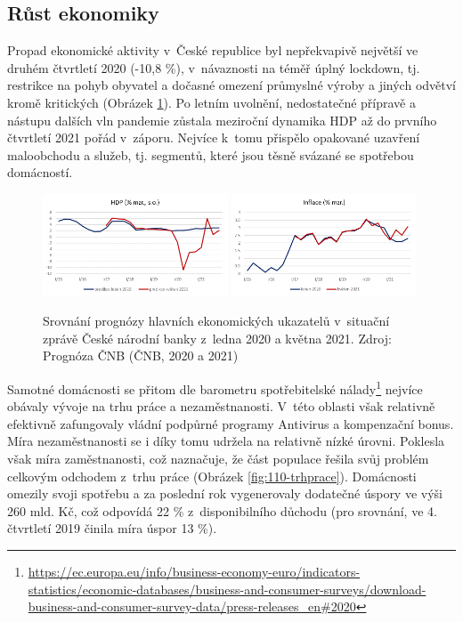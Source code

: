 \subsection*{R\r{u}st ekonomiky} 
Propad ekonomické aktivity v~České republice byl nepřekvapivě největší ve druhém čtvrtletí 2020 (-10,8 \%), v~návaznosti na téměř úplný lockdown, tj. restrikce na pohyb obyvatel a dočasné omezení průmyslné výroby a jiných odvětví kromě kritických (Obrázek \ref{fig:110-HDP}). Po letním uvolnění, nedostatečné přípravě a nástupu dalších vln pandemie zůstala meziroční dynamika HDP až do prvního čtvrtletí 2021 pořád v~záporu. Nejvíce k~tomu přispělo opakované uzavření maloobchodu a služeb, tj. segmentů, které jsou těsně svázané se spotřebou domácností. 

\begin{figure}[ht]
    \centering
    \includegraphics[width=0.49\textwidth]{./pic/HDP.png} \includegraphics[width=0.49\textwidth]{./pic/inflace.png}
    \caption{Srovnání prognózy hlavních ekonomických ukazatelů v~situační zprávě České národní banky z~ledna 2020 a května 2021. Zdroj: Prognóza ČNB (ČNB, 2020 a 2021)}
    \label{fig:110-HDP}
\end{figure} 

Samotné domácnosti se přitom dle barometru spotřebitelské nálady\footnote{\url{https://ec.europa.eu/info/business-economy-euro/indicators-statistics/economic-databases/business-and-consumer-surveys/download-business-and-consumer-survey-data/press-releases_en\#2020}} nejvíce obávaly vývoje na trhu práce a nezaměstnanosti. V~této oblasti však relativně efektivně zafungovaly vládní podpůrné programy Antivirus a kompenzační bonus. Míra nezaměstnanosti se i díky tomu udržela na relativně nízké úrovni. Poklesla však míra za\-měst\-na\-nos\-ti, což naznačuje, že část populace řešila svůj problém celkovým odchodem z~trhu práce (Obrázek \ref{fig:110-trhprace}). Domácnosti omezily svoji spotřebu a za poslední rok vygenerovaly dodatečné úspory ve výši 260 mld. Kč, což odpovídá 22 \% z~disponibilního důchodu (pro srovnání, ve 4. čtvrtletí 2019 činila míra úspor 13 \%). 

